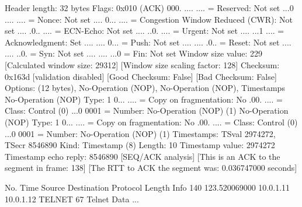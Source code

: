    Header length: 32 bytes
    Flags: 0x010 (ACK)
        000. .... .... = Reserved: Not set
        ...0 .... .... = Nonce: Not set
        .... 0... .... = Congestion Window Reduced (CWR): Not set
        .... .0.. .... = ECN-Echo: Not set
        .... ..0. .... = Urgent: Not set
        .... ...1 .... = Acknowledgment: Set
        .... .... 0... = Push: Not set
        .... .... .0.. = Reset: Not set
        .... .... ..0. = Syn: Not set
        .... .... ...0 = Fin: Not set
    Window size value: 229
    [Calculated window size: 29312]
    [Window size scaling factor: 128]
    Checksum: 0x163d [validation disabled]
        [Good Checksum: False]
        [Bad Checksum: False]
    Options: (12 bytes), No-Operation (NOP), No-Operation (NOP), Timestamps
        No-Operation (NOP)
            Type: 1
                0... .... = Copy on fragmentation: No
                .00. .... = Class: Control (0)
                ...0 0001 = Number: No-Operation (NOP) (1)
        No-Operation (NOP)
            Type: 1
                0... .... = Copy on fragmentation: No
                .00. .... = Class: Control (0)
                ...0 0001 = Number: No-Operation (NOP) (1)
        Timestamps: TSval 2974272, TSecr 8546890
            Kind: Timestamp (8)
            Length: 10
            Timestamp value: 2974272
            Timestamp echo reply: 8546890
    [SEQ/ACK analysis]
        [This is an ACK to the segment in frame: 138]
        [The RTT to ACK the segment was: 0.036747000 seconds]

No.     Time           Source                Destination           Protocol Length Info
    140 123.520069000  10.0.1.11             10.0.1.12             TELNET   67     Telnet Data ...

